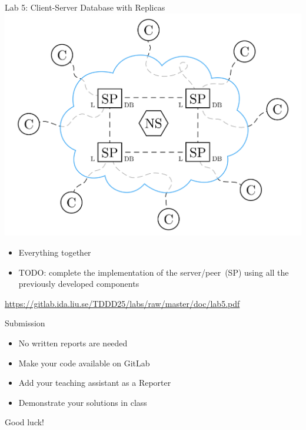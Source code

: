 \documentclass[compress,xcolor=table]{beamer}
\begin{document}
\begin{frame}{Lab 5: Client-Server Database with Replicas}
  \centering
  \includegraphics[scale=0.10,page=1]{include/assets/distributed-database}
  \begin{itemize}
    \item Everything together
    \item \alert{TODO}: complete the implementation of the server/peer~(SP)
    using all the previously developed components
  \end{itemize}
  \begin{center}
    \scriptsize \url{https://gitlab.ida.liu.se/TDDD25/labs/raw/master/doc/lab5.pdf}
  \end{center}
\end{frame}

\begin{frame}{Submission}
  \centering
  \begin{itemize}
    \item No written reports are needed
    \item Make your code available on GitLab
    \item Add your teaching assistant as a Reporter
    \item Demonstrate your solutions in class
  \end{itemize}
\end{frame}

\begin{frame}
  \vspace{3em}
  \begin{center}
    {\huge Good luck!}
  \end{center}
\end{frame}
\end{document}
